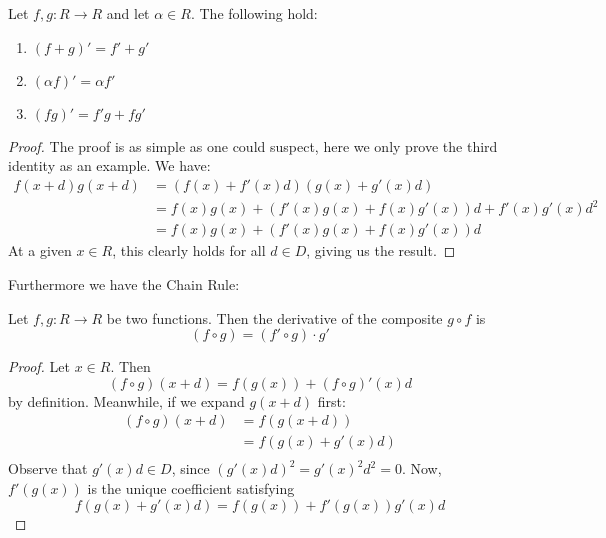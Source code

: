 \begin{proposition}
  Let \( f,g:R\to R \) and let \(\alpha\in R.\) The following hold:
  \begin{enumerate}
    \item \((f+g)' = f'+g'\)
    \item \((\alpha f)' = \alpha f'\)
    \item \((fg)' = f'g + fg'\)
  \end{enumerate}
\end{proposition}
\begin{proof}
  The proof is as simple as one could suspect, here we only prove the third identity as an example. We have:
  \begin{align*}
    f(x+d)g(x+d) & = (f(x)+f'(x)d)(g(x)+g'(x)d) \\
                 & = f(x)g(x) + (f'(x)g(x)+f(x)g'(x))d + f'(x)g'(x)d^2 \\
		 & = f(x)g(x) + (f'(x)g(x)+f(x)g'(x))d  
    \label{eq:prodrule}
  \end{align*}
  At a given \( x\in R \), this clearly holds for all \( d\in D \), giving us the result.
\end{proof}

Furthermore we have the Chain Rule:
\begin{proposition}
  Let \( f,g:R\to R \) be two functions. Then the derivative of the composite \( g\circ f \) is
  \begin{equation*}
    (f\circ g) = (f'\circ g)\cdot g'
  \end{equation*}
\end{proposition}
\begin{proof}
  Let \( x\in R \). Then
  \begin{equation*}
   (f\circ g)(x+d) = f(g(x)) + (f\circ g)'(x)d
  \end{equation*}
  by definition. Meanwhile, if we expand \( g(x+d) \) first:
  \begin{align*}
    (f\circ g)(x+d) & = f(g(x+d)) \\
                    & = f(g(x)+g'(x)d) \\
  \end{align*}
  Observe that \( g'(x)d\in D \), since \( (g'(x)d)^2 = g'(x)^2d^2 = 0 \). Now, \( f'(g(x)) \) is the unique coefficient satisfying
  \begin{equation*}
    f(g(x)+g'(x)d) = f(g(x)) + f'(g(x))g'(x)d
  \end{equation*}
\end{proof}

